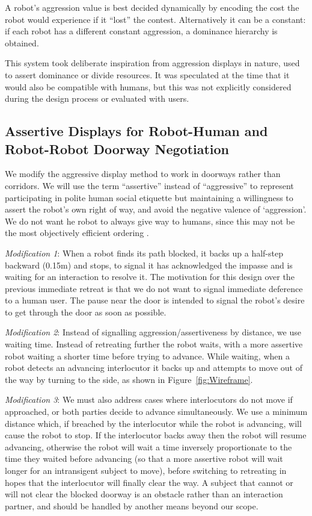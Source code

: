 \documentclass[letterpaper, 10 pt, conference]{ieeeconf}  %
\begin{document}
A robot's aggression value is best decided dynamically by encoding the cost the robot would experience if it ``lost'' the contest. Alternatively it can be a constant: if each robot has a different constant aggression, a dominance hierarchy is obtained.
 
This system took deliberate inspiration from aggression displays in nature, used to assert dominance or divide resources. It was speculated at the time that it would also be compatible with humans, but this was not explicitly considered during the design process or evaluated with users. 


\subsection{Assertive Displays for Robot-Human and Robot-Robot Doorway Negotiation}

We modify the aggressive display method to work in doorways rather than corridors. We will use the term ``assertive'' instead of ``aggressive'' to  represent participating in polite human social etiquette but maintaining a willingness to assert the robot’s own right of way, and avoid the negative valence of `aggression'. We do not want he robot to always give way to humans, since this may not be the most objectively efficient ordering \cite{c1}.


\textit{Modification 1}:  When a robot finds its path blocked, it backs up a half-step backward (0.15m) and stops, to signal it has acknowledged the impasse and is waiting for an interaction to resolve it. The motivation for this design over the previous immediate retreat is that we do not want to signal immediate deference to a human user. The pause near the door is intended to signal the robot's desire to get through the door as soon as possible.

\textit{Modification 2}: Instead of signalling aggression/assertiveness by distance, we use waiting time. Instead of retreating further the robot waits, with a more assertive robot waiting a shorter time before trying to advance. While waiting, when a robot detects an advancing interlocutor it backs up and attempts to move out of the way by turning to the side, as shown in Figure~\ref{fig:Wireframe}.


\textit{Modification 3}: We must also address cases where interlocutors do not move if approached, or both parties decide to advance simultaneously. We use a minimum distance which, if breached by the interlocutor while the robot is advancing, will cause the robot to stop. If the interlocutor backs away then the robot will resume advancing, otherwise the robot will wait a time inversely proportionate to the time they waited before advancing (so that a more assertive robot will wait longer for an intransigent subject to move), before switching to retreating in hopes that the interlocutor will finally clear the way. A subject that cannot or will not clear the blocked doorway is an obstacle rather than an interaction partner, and should be handled by another means beyond our scope. 
 
\end{document}
